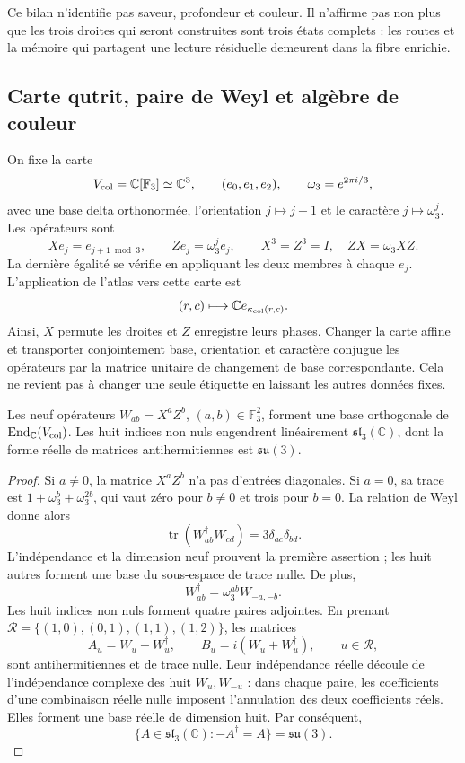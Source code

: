 Ce bilan n’identifie pas saveur, profondeur et couleur. Il n’affirme pas non plus que les trois droites qui seront construites sont trois états complets : les routes et la mémoire qui partagent une lecture résiduelle demeurent dans la fibre enrichie.

\subsection{Carte qutrit, paire de Weyl et algèbre de couleur}
\label{hmtcuatro:color:weyl}

On fixe la carte
\[
 V_{\rm col}=\mathbb C[\mathbb F_3]\simeq\mathbb C^3,
 \qquad (e_0,e_1,e_2),\qquad
 \omega_3=e^{2\pi i/3},
\]
avec une base delta orthonormée, l’orientation \(j\mapsto j+1\) et le caractère \(j\mapsto\omega_3^j\). Les opérateurs sont
\[
 Xe_j=e_{j+1\bmod3},\qquad Ze_j=\omega_3^j e_j,
 \qquad X^3=Z^3=I,\quad ZX=\omega_3XZ.
\]
La dernière égalité se vérifie en appliquant les deux membres à chaque \(e_j\). L’application de l’atlas vers cette carte est
\[
 (r,c)\longmapsto\mathbb C e_{\kappa_{\rm col}(r,c)}.
\]
Ainsi, \(X\) permute les droites et \(Z\) enregistre leurs phases. Changer la carte affine et transporter conjointement base, orientation et caractère conjugue les opérateurs par la matrice unitaire de changement de base correspondante. Cela ne revient pas à changer une seule étiquette en laissant les autres données fixes.

\begin{theorem}
\label{hmtcuatro:color:algebra} Les neuf opérateurs \(W_{ab}=X^aZ^b\), \((a,b)\in\mathbb F_3^2\), forment une base orthogonale de \(\operatorname{End}_{\mathbb C}(V_{\rm col})\). Les huit indices non nuls engendrent linéairement \(\mathfrak{sl}_3(\mathbb C)\), dont la forme réelle de matrices antihermitiennes est \(\mathfrak{su}(3)\).
\end{theorem}
\begin{proof}
Si \(a\ne0\), la matrice \(X^aZ^b\) n’a pas d’entrées diagonales. Si \(a=0\), sa trace est \(1+\omega_3^b+\omega_3^{2b}\), qui vaut zéro pour \(b\ne0\) et trois pour \(b=0\). La relation de Weyl donne alors
\[
 \operatorname{tr}(W_{ab}^{\dagger}W_{cd})
 =3\delta_{ac}\delta_{bd}.
\]
L’indépendance et la dimension neuf prouvent la première assertion ; les huit autres forment une base du sous-espace de trace nulle. De plus,
\[
 W_{ab}^{\dagger}=\omega_3^{ab}W_{-a,-b}.
\]
Les huit indices non nuls forment quatre paires adjointes. En prenant \(\mathcal R=\{(1,0),(0,1),(1,1),(1,2)\}\), les matrices
\[
 A_u=W_u-W_u^{\dagger},\qquad
 B_u=i(W_u+W_u^{\dagger}),\qquad u\in\mathcal R,
\]
sont antihermitiennes et de trace nulle. Leur indépendance réelle découle de l’indépendance complexe des huit \(W_u,W_{-u}\) : dans chaque paire, les coefficients d’une combinaison réelle nulle imposent l’annulation des deux coefficients réels. Elles forment une base réelle de dimension huit. Par conséquent,
\[
 \{A\in\mathfrak{sl}_3(\mathbb C):-A^{\dagger}=A\}
 =\mathfrak{su}(3).
\]
\end{proof}

